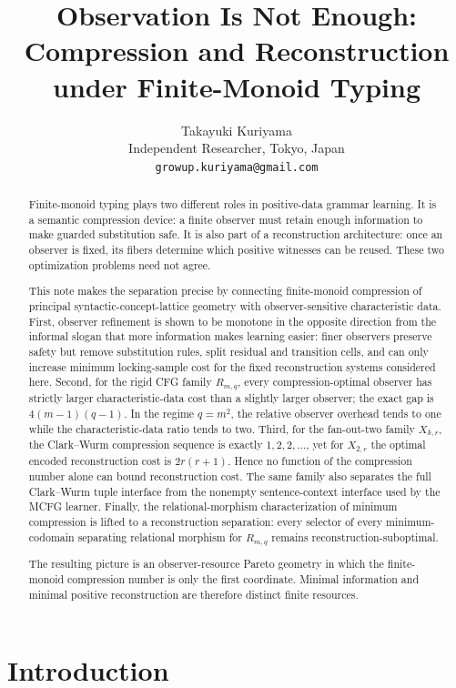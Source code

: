 \documentclass[11pt]{article}
\title{Observation Is Not Enough:\\
Compression and Reconstruction under Finite-Monoid Typing}
\author{Takayuki Kuriyama\\Independent Researcher, Tokyo, Japan\\\texttt{growup.kuriyama@gmail.com}}
\date{}
\theoremstyle{definition}
\theoremstyle{remark}
\begin{document}
\maketitle

\begin{abstract}
Finite-monoid typing plays two different roles in positive-data grammar
learning.  It is a semantic compression device: a finite observer must retain
enough information to make guarded substitution safe.  It is also part of a
reconstruction architecture: once an observer is fixed, its fibers determine
which positive witnesses can be reused.  These two optimization problems need
not agree.

This note makes the separation precise by connecting finite-monoid compression
of principal syntactic-concept-lattice geometry with observer-sensitive
characteristic data.  First, observer refinement is shown to be monotone in the
opposite direction from the informal slogan that more information makes
learning easier: finer observers preserve safety but remove substitution
rules, split residual and transition cells, and can only increase minimum
locking-sample cost for the fixed reconstruction systems considered here.
Second, for the rigid CFG family $R_{m,q}$, every compression-optimal observer
has strictly larger characteristic-data cost than a slightly larger observer;
the exact gap is $4(m-1)(q-1)$.  In the regime $q=m^2$, the relative observer
overhead tends to one while the characteristic-data ratio tends to two.
Third, for the fan-out-two family $X_{k,r}$, the Clark--Wurm compression
sequence is exactly $1,2,2,\ldots$, yet for $X_{2,r}$ the optimal encoded
reconstruction cost is $2r(r+1)$.  Hence no function of the compression number
alone can bound reconstruction cost.  The same family also separates the full
Clark--Wurm tuple interface from the nonempty sentence-context interface used
by the MCFG learner.  Finally, the relational-morphism characterization of
minimum compression is lifted to a reconstruction separation: every selector
of every minimum-codomain separating relational morphism for $R_{m,q}$ remains
reconstruction-suboptimal.

The resulting picture is an observer-resource Pareto geometry in which the
finite-monoid compression number is only the first coordinate.  Minimal
information and minimal positive reconstruction are therefore distinct finite
resources.
\end{abstract}

\section{Introduction}
\end{document}
